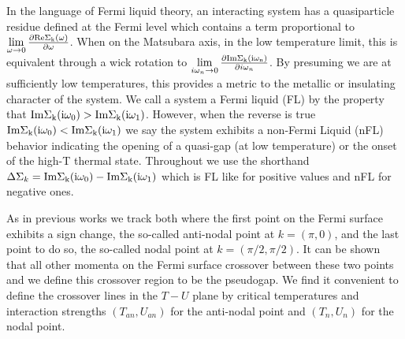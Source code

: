 \documentclass[twocolumn,notitlepage,prl,superscriptaddress,showpacs]{revtex4-1}
\begin{document}
In the language of Fermi liquid theory, an interacting system has a quasiparticle residue  defined at the Fermi level which contains a term proportional to $\lim\limits_{\omega\to 0}\frac{\partial \rm{Re}\Sigma_k (\omega)}{\partial \omega}$.  When on the 
Matsubara axis, in the low temperature limit, this is equivalent through a wick rotation to $\lim\limits_{i\omega_n\to 0}\frac{\partial \rm{Im}\Sigma_k(i\omega_n)}{\partial i\omega_n}$.  By presuming we are at sufficiently low temperatures, this provides a metric to the metallic or insulating character of the system.  We call a system a Fermi liquid (FL) by the property that $\rm{Im}\Sigma_k (i\omega_0) >\rm{Im}\Sigma_k (i\omega_1)$.  However, when the reverse is true $\rm{Im}\Sigma_k (i\omega_0) <\rm{Im}\Sigma_k (i\omega_1)$ we say the system exhibits a non-Fermi 
Liquid (nFL) behavior indicating the opening of a quasi-gap (at low temperature) or the onset of the high-T thermal state.  Throughout we use the shorthand $\Delta \Sigma_k = \rm{Im}\Sigma_k (i\omega_0) -\rm{Im}\Sigma_k (i\omega_1)$ which is FL like for positive values and nFL for negative ones.

As in previous works we track both where the first point on the Fermi surface exhibits a sign change, the so-called anti-nodal point at $k=(\pi,0)$, and the last point to do so, the so-called nodal point at $k=(\pi/2,\pi/2)$. It can be shown that all other momenta on the Fermi surface crossover between these two points and we define this crossover region to be the pseudogap.\cite{schafer:2015}
We find it convenient to define the crossover lines in the $T-U$ plane by critical temperatures and interaction strengths $(T_{an},U_{an})$ for the anti-nodal point and $(T_n,U_n)$ for the nodal point.

\end{document}
